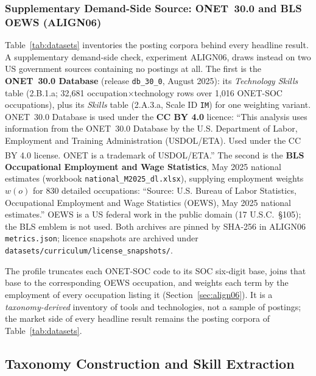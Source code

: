 \documentclass[journal]{IEEEtran}
\begin{document}
\subsubsection{Supplementary Demand-Side Source: O\*NET~30.0 and BLS OEWS (ALIGN06)}
\label{sec:align06_data}

Table~\ref{tab:datasets} inventories the posting corpora behind every headline result. A supplementary demand-side check, experiment ALIGN06, draws instead on two US government sources containing no postings at all. The first is the \textbf{O\*NET~30.0 Database} (release \texttt{db\_30\_0}, August 2025): its \textit{Technology Skills} table (2.B.1.a; 32,681 occupation$\times$technology rows over 1,016 O\*NET-SOC occupations), plus its \textit{Skills} table (2.A.3.a, Scale ID \texttt{IM}) for one weighting variant. O\*NET~30.0 Database is used under the \textbf{CC BY 4.0} licence: ``This analysis uses information from the O\*NET~30.0 Database by the U.S. Department of Labor, Employment and Training Administration (USDOL/ETA). Used under the CC BY 4.0 license. O\*NET\textsuperscript{\textregistered} is a trademark of USDOL/ETA.'' The second is the \textbf{BLS Occupational Employment and Wage Statistics}, May 2025 national estimates (workbook \texttt{national\_M2025\_dl.xlsx}), supplying employment weights $w(o)$ for 830 detailed occupations: ``Source: U.S. Bureau of Labor Statistics, Occupational Employment and Wage Statistics (OEWS), May 2025 national estimates.'' OEWS is a US federal work in the public domain (17 U.S.C.~\S105); the BLS emblem is not used. Both archives are pinned by SHA-256 in ALIGN06 \texttt{metrics.json}; licence snapshots are archived under \texttt{datasets/curriculum/license\_snapshots/}.

The profile truncates each O\*NET-SOC code to its SOC six-digit base, joins that base to the corresponding OEWS occupation, and weights each term by the employment of every occupation listing it (Section~\ref{sec:align06}). It is a \emph{taxonomy-derived} inventory of tools and technologies, not a sample of postings; the market side of every headline result remains the posting corpora of Table~\ref{tab:datasets}.

\subsection{Taxonomy Construction and Skill Extraction}
\end{document}
